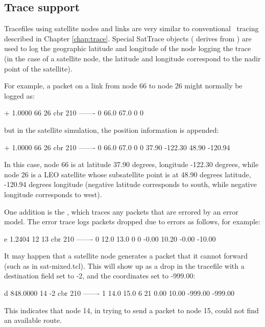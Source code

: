 
\subsection{Trace support}
\label{sec:satellite/usage/trace}

Tracefiles using satellite nodes and links are very similar to conventional
\ns~tracing described in Chapter \ref{chap:trace}.  Special SatTrace objects
( derives from ) are used
to log the geographic latitude and longitude of the node logging the trace
(in the case of a satellite node, the latitude and longitude correspond
to the nadir point of the satellite).

For example, a packet on a link from node 66 to node 26 might normally be
logged as:  
\begin{program}
+ 1.0000 66 26 cbr 210 ------- 0 66.0 67.0 0 0 
\end{program}
but in the satellite simulation, the position information is appended:
\begin{program}
+ 1.0000 66 26 cbr 210 ------- 0 66.0 67.0 0 0 37.90 -122.30 48.90 -120.94
\end{program}
In this case, node 66 is at latitude 37.90 degrees, longitude -122.30
degrees, while node 26 is a LEO satellite whose subsatellite
point is at 48.90 degrees latitude, -120.94 degrees longitude (negative
latitude corresponds to south, while negative longitude corresponds to
west).

One addition is the , which traces any packets
that are errored by an error model.  The error trace logs packets dropped
due to errors as follows, for example:  
\begin{program}
e 1.2404 12 13 cbr 210 ------- 0 12.0 13.0 0 0 -0.00 10.20 -0.00 -10.00
\end{program}

It may happen that a satellite node generates a packet that it cannot
forward (such as in sat-mixed.tcl).  This will show up as a drop in
the tracefile with a destination field set to -2, and the coordinates
set to -999.00:
\begin{program}
d 848.0000 14 -2 cbr 210 ------- 1 14.0 15.0 6 21 0.00 10.00 -999.00 -999.00 
\end{program}
This indicates that node 14, in trying to send a packet to node 15, could
not find an available route.

